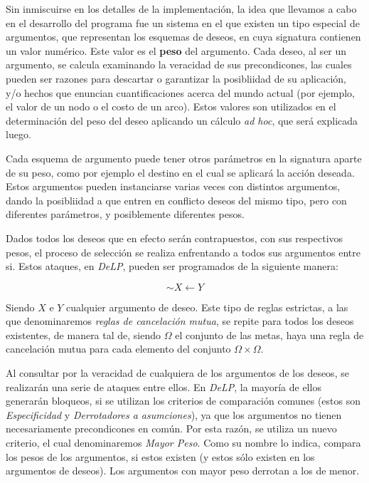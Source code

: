 \documentclass[oneside]{book}
\begin{document}
\label{sec:ideaGeneral}

Sin inmiscuirse en los detalles de la implementación, la idea que llevamos a cabo en el 
desarrollo del programa fue un sistema en el que existen un tipo especial de argumentos,
que representan los esquemas de deseos, en cuya signatura contienen un valor numérico.
Este valor es el \textbf{peso} %
del argumento. Cada deseo, al ser un argumento, se calcula examinando la veracidad de sus
precondicones, las cuales pueden ser razones para descartar o garantizar la posibliidad de
su aplicación, y/o hechos que enuncian cuantificaciones acerca del mundo actual (por 
ejemplo, el valor de un nodo o el costo de un arco). Estos valores son utilizados en el
determinación del peso del deseo aplicando un cálculo \textit{ad hoc}, %
que será explicada luego.

Cada esquema de argumento puede tener otros parámetros en la signatura aparte de su peso,
como por ejemplo el destino en el cual se aplicará la acción deseada. Estos argumentos
pueden instanciarse varias veces con distintos argumentos, dando la posibliidad a que 
entren en conflicto deseos del mismo tipo, pero con diferentes parámetros, y posiblemente
diferentes pesos.

Dados todos los deseos que en efecto serán contrapuestos, con sus respectivos pesos, el 
proceso de selección se realiza enfrentando a todos sus argumentos entre si. Estos 
ataques, en \textit{DeLP}, pueden ser programados de la siguiente manera:

$$ \sim X \leftarrow Y$$ 

Siendo $X$ e $Y$ cualquier argumento de deseo. Este tipo de reglas estrictas, a las que
denominaremos \textit{reglas de cancelación mutua}, se repite 
para todos los deseos existentes, de manera tal de, siendo $\Omega$ el conjunto de las 
metas, haya una regla de cancelación mutua para cada elemento del conjunto
$\Omega \times \Omega$.

Al consultar por la veracidad de cualquiera de los argumentos de los deseos, se realizarán
una serie de ataques entre ellos. En \textit{DeLP}, la mayoría de ellos generarán bloqueos, si se 
utilizan los criterios de comparación comunes (estos son \textit{Especificidad} y 
\textit{Derrotadores a asumciones}), ya que los argumentos no tienen necesariamente 
precondicones en común. Por esta razón, se utiliza un nuevo criterio, el cual 
denominaremos \textit{Mayor Peso}. Como su nombre lo indica, compara los pesos de los 
argumentos, si estos existen (y estos sólo existen en los argumentos de deseos). Los 
argumentos con mayor peso derrotan a los de menor.
\end{document}
